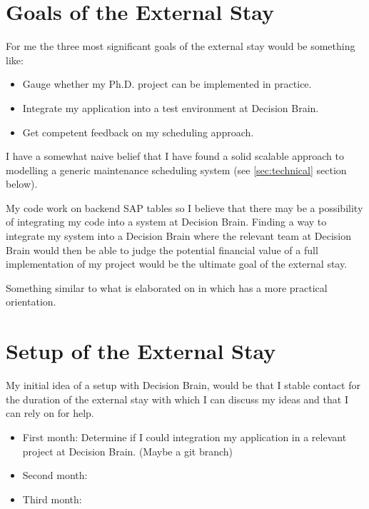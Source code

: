 \section*{Goals of the External Stay}
For me the three most significant goals of the external stay would be something like:

\begin{itemize}
	\item Gauge whether my Ph.D. project can be implemented in practice. 
	\item Integrate my application into a test environment at Decision Brain.
	\item Get competent feedback on my scheduling approach. 
\end{itemize}

I have a somewhat naive belief that I have found a solid scalable approach to modelling a generic 
maintenance scheduling system (see \ref{sec:technical} section below). 

My code work on backend SAP tables so I believe that there may be a possibility of integrating my 
code into a system at Decision Brain. Finding a way to integrate my system into a Decision Brain
where the relevant team at Decision Brain would then be able to judge the potential financial value 
of a full implementation of my project would be the ultimate goal of the external stay.

Something similar to what is elaborated on in \cite{palmerMaintenancePlanningScheduling2019} which has a 
more practical orientation. 

\section*{Setup of the External Stay}
My initial idea of a setup with Decision Brain, would be that I stable contact for the duration of the external stay with which
I can discuss my ideas and that I can rely on for help.

\begin{itemize}
	\item First month: Determine if I could integration my application in a relevant project at Decision Brain. (Maybe a git branch)
	\item Second month:  
	\item Third month:
\end{itemize}
